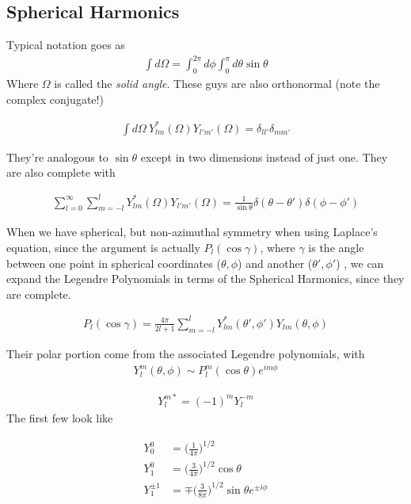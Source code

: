 \subsection{Spherical Harmonics}


Typical notation goes as 
\begin{align}
\int d\Omega = \int_0^{2\pi} d\phi \int_0^\pi d\theta \sin\theta
\end{align}
Where $\Omega$ is called the \emph{solid angle}. These guys are also orthonormal (note the complex conjugate!)

\begin{align}
\int d\Omega~Y^*_{lm}(\Omega)Y_{l'm'}(\Omega) = \delta_{ll'}\delta_{mm'}
\end{align}

They're analogous to $\sin\theta$  except in two dimensions instead of just one. They are also complete with

\begin{align}
\sum_{l=0}^\infty \sum_{m=-l}^l Y^*_{lm}(\Omega)Y_{l'm'}(\Omega) = \frac{1}{\sin\theta}\delta(\theta-\theta')\delta(\phi-\phi')
\end{align}

When we have spherical, but non-azimuthal symmetry when using Laplace's equation, since the argument is actually $P_l(\cos\gamma)$, where $\gamma$ is the angle between one point in spherical coordinates ($\theta,\phi$) and another ($\theta',\phi'$) , we can expand the Legendre Polynomials in terms of the Spherical Harmonics, since they are complete.

\begin{align}
P_l(\cos\gamma) = \frac{4\pi}{2l+1}\sum_{m=-l}^l Y_{lm}^*(\theta', \phi')Y_{lm}(\theta,\phi)
\end{align}


Their polar portion come from the associated Legendre polynomials, with
\begin{align}
Y^m_l(\theta,\phi) \sim P_l^m(\cos\theta)e^{im\phi}
\end{align}


\begin{align}
Y^{m*}_{l}= (-1)^mY^{-m}_l
\end{align}
The first few look like

\begin{align}
Y_0^0 &= \Big(\frac{1}{4\pi}\Big)^{1/2}\\
Y_1^0 &= \Big(\frac{3}{4\pi}\Big)^{1/2}\cos\theta\\
Y_1^{\pm 1} &= \mp \Big(\frac{3}{8\pi}\Big)^{1/2}\sin\theta e^{\pm i\phi}
\end{align}

